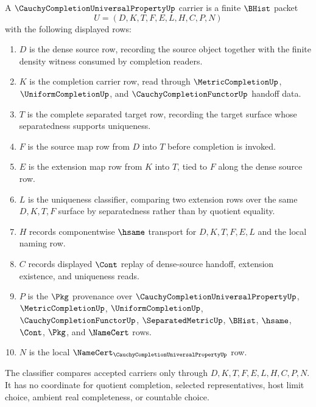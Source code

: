 \begin{definition}
\label{def:cauchy-completion-universal-property-carrier}
A $\CauchyCompletionUniversalPropertyUp$ carrier is a finite $\BHist$ packet
$$
U=(D,K,T,F,E,L,H,C,P,N)
$$
with the following displayed rows:
\begin{enumerate}
\item $D$ is the dense source row, recording the source object together with the finite density witness consumed by completion readers.
\item $K$ is the completion carrier row, read through $\MetricCompletionUp$, $\UniformCompletionUp$, and $\CauchyCompletionFunctorUp$ handoff data.
\item $T$ is the complete separated target row, recording the target surface whose separatedness supports uniqueness.
\item $F$ is the source map row from $D$ into $T$ before completion is invoked.
\item $E$ is the extension map row from $K$ into $T$, tied to $F$ along the dense source row.
\item $L$ is the uniqueness classifier, comparing two extension rows over the same $D,K,T,F$ surface by separatedness rather than by quotient equality.
\item $H$ records componentwise $\hsame$ transport for $D,K,T,F,E,L$ and the local naming row.
\item $C$ records displayed $\Cont$ replay of dense-source handoff, extension existence, and uniqueness reads.
\item $P$ is the $\Pkg$ provenance over $\CauchyCompletionUniversalPropertyUp$, $\MetricCompletionUp$, $\UniformCompletionUp$, $\CauchyCompletionFunctorUp$, $\SeparatedMetricUp$, $\BHist$, $\hsame$, $\Cont$, $\Pkg$, and $\NameCert$ rows.
\item $N$ is the local $\NameCert_{\CauchyCompletionUniversalPropertyUp}$ row.
\end{enumerate}
The classifier compares accepted carriers only through $D,K,T,F,E,L,H,C,P,N$. It has no coordinate for quotient completion, selected representatives, host limit choice, ambient real completeness, or countable choice.
\end{definition}

